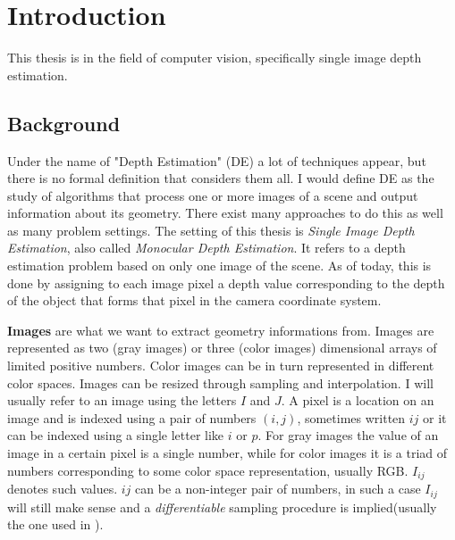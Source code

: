 \chapter{Introduction}
\label{ch:intro}

This thesis is in the field of computer vision, specifically single image depth estimation.

\section{Background}
Under the name of "Depth Estimation" (DE) a lot of techniques appear, but there is no formal definition that considers them all.
I would define DE as the study of algorithms that process one or more images of a scene and output information about its geometry.
There exist many approaches to do this as well as many problem settings.
The setting of this thesis is \textit{Single Image Depth Estimation}, also called \textit{Monocular Depth Estimation}.
It refers to a depth estimation problem based on only one image of the scene.
As of today, this is done by assigning to each image pixel a depth value corresponding to the depth of the object that forms that pixel in the camera coordinate system.


\textbf{Images} are what we want to extract geometry informations from.
Images are represented as two (gray images) or three (color images) dimensional arrays of limited positive numbers.
Color images can be in turn represented in different color spaces.
Images can be resized through sampling and interpolation.
I will usually refer to an image using the letters $I$ and $J$.
A pixel is a location on an image and is indexed using a pair of numbers $(i, j)$, sometimes written $ij$ or it can be indexed using a single letter like $i$ or $p$.
For gray images the value of an image in a certain pixel is a single number, while for color images it is a triad of numbers corresponding to some color space representation, usually RGB.
$I_{ij}$ denotes such values.
$ij$ can be a non-integer pair of numbers, in such a case $I_{ij}$ will still make sense and a \textit{differentiable} sampling procedure is implied(usually the one used in \cite{STN}).


